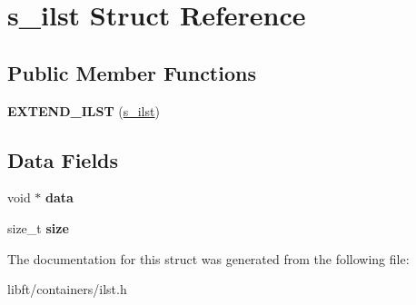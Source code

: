 \hypertarget{structs__ilst}{}\section{s\+\_\+ilst Struct Reference}
\label{structs__ilst}
\subsection*{Public Member Functions}
\begin{DoxyCompactItemize}
\item 
\hypertarget{structs__ilst_a844a2932a8a2bed1b254e1a5451655cd}{}{\bfseries E\+X\+T\+E\+N\+D\+\_\+\+I\+L\+S\+T} (\hyperlink{structs__ilst}{s\+\_\+ilst})\label{structs__ilst_a844a2932a8a2bed1b254e1a5451655cd}

\end{DoxyCompactItemize}
\subsection*{Data Fields}
\begin{DoxyCompactItemize}
\item 
\hypertarget{structs__ilst_a735984d41155bc1032e09bece8f8d66d}{}void $\ast$ {\bfseries data}\label{structs__ilst_a735984d41155bc1032e09bece8f8d66d}

\item 
\hypertarget{structs__ilst_a854352f53b148adc24983a58a1866d66}{}size\+\_\+t {\bfseries size}\label{structs__ilst_a854352f53b148adc24983a58a1866d66}

\end{DoxyCompactItemize}


The documentation for this struct was generated from the following file\+:\begin{DoxyCompactItemize}
\item 
libft/containers/ilst.\+h\end{DoxyCompactItemize}
